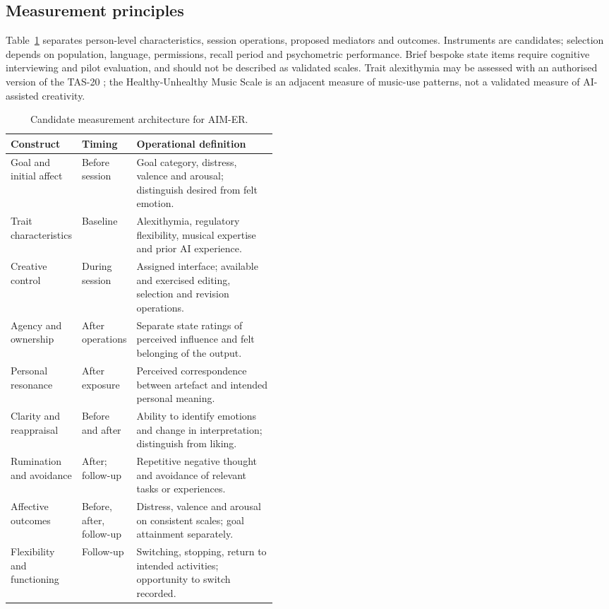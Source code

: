 \subsection{Measurement principles}
Table~\ref{tab:measures} separates person-level characteristics, session operations, proposed mediators and outcomes. Instruments are candidates; selection depends on population, language, permissions, recall period and psychometric performance. Brief bespoke state items require cognitive interviewing and pilot evaluation, and should not be described as validated scales. Trait alexithymia may be assessed with an authorised version of the TAS-20 \citep{bagby1994}; the Healthy-Unhealthy Music Scale \citep{hums2015} is an adjacent measure of music-use patterns, not a validated measure of AI-assisted creativity.

\begin{table}[htbp]
\centering\small
\caption{Candidate measurement architecture for AIM-ER.}
\label{tab:measures}
\begin{tabularx}{\linewidth}{@{}>{\raggedright\arraybackslash}p{0.25\linewidth}>{\raggedright\arraybackslash}p{0.19\linewidth}>{\raggedright\arraybackslash}X@{}}
\toprule
Construct & Timing & Operational definition \\
\midrule
Goal and initial affect & Before session & Goal category, distress, valence and arousal; distinguish desired from felt emotion. \\
Trait characteristics & Baseline & Alexithymia, regulatory flexibility, musical expertise and prior AI experience. \\
Creative control & During session & Assigned interface; available and exercised editing, selection and revision operations. \\
Agency and ownership & After operations & Separate state ratings of perceived influence and felt belonging of the output. \\
Personal resonance & After exposure & Perceived correspondence between artefact and intended personal meaning. \\
Clarity and reappraisal & Before and after & Ability to identify emotions and change in interpretation; distinguish from liking. \\
Rumination and avoidance & After; follow-up & Repetitive negative thought and avoidance of relevant tasks or experiences. \\
Affective outcomes & Before, after, follow-up & Distress, valence and arousal on consistent scales; goal attainment separately. \\
Flexibility and functioning & Follow-up & Switching, stopping, return to intended activities; opportunity to switch recorded. \\
\bottomrule
\end{tabularx}
\end{table}

